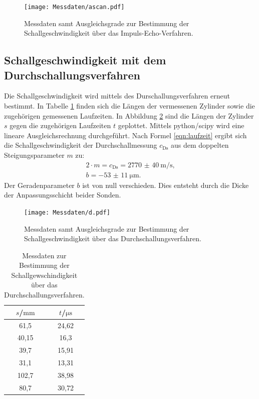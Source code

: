 \begin{figure}
  \centering
  \texttt{[image: Messdaten/ascan.pdf]}
  \caption{Messdaten samt Ausgleichsgrade zur Bestimmung der Schallgeschwindigkeit über das Impuls-Echo-Verfahren.}
  \label{fig:iev}
\end{figure}
\FloatBarrier

\subsection{Schallgeschwindigkeit mit dem Durchschallungsverfahren}
Die Schallgeschwindigkeit wird mittels des Durschallungsverfahren erneut bestimmt.
In Tabelle \ref{tab:durchschall} finden sich die Längen der vermessenen Zylinder sowie die zugehörigen gemessenen Laufzeiten.
In Abbildung \ref{fig:durchschall} sind die Längen der Zylinder $s$ gegen die zugehörigen Laufzeiten $t$ geplottet. Mittels python/scipy \cite{scipy} wird eine lineare Ausgleichsrechnung durchgeführt.
Nach Formel \eqref{eqn:laufzeit} ergibt sich die Schallgeschwindigkeit der Durchschallmessung $c_\mathrm{Ds}$ aus dem doppelten Steigungsparameter $m$ zu:
\begin{gather*}
  2\cdot m=c_\mathrm{Ds}=  \SI{2770(40)}{\meter\per\second}\text{,}\\
  b= \SI{-53(11)}{\micro\meter}\text{.}
\end{gather*}
Der Geradenparameter $b$ ist von null verschieden. Dies entsteht durch die Dicke der Anpassungsschicht beider Sonden.
\begin{figure}
  \centering
  \texttt{[image: Messdaten/d.pdf]}
  \caption{Messdaten samt Ausgleichsgrade zur Bestimmung der Schallgeschwindigkeit über das Durchschallungsverfahren.}
  \label{fig:durchschall}
\end{figure}
\begin{table}
  \centering
  \caption{Messdaten zur Bestimmung der Schallgewschindigkeit über das Durchschallungsverfahren.}
  \label{tab:durchschall}
\begin{tabular}{cc}
  \toprule
$s$/$\si{\milli\meter}$ & $t$/$\si{\micro\second}$ \\
\midrule
61,5 & 24,62 \\
40,15 & 16,3 \\
39,7 & 15,91 \\
31,1 & 13,31 \\
102,7 & 38,98 \\
80,7 & 30,72 \\
\bottomrule
\end{tabular}
\end{table}
\FloatBarrier
